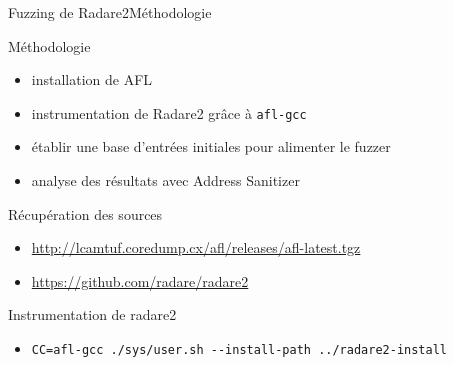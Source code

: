 \begin{frame}[fragile]{Fuzzing de Radare2}{Méthodologie}
  \begin{block}{Méthodologie}
    \begin{itemize}
    \item{installation de AFL}
    \item{instrumentation de Radare2 grâce à \lstinline{afl-gcc}}
    \item{établir une base d'entrées initiales pour alimenter le fuzzer}
    \item{analyse des résultats avec Address Sanitizer}
    \end{itemize}
  \end{block}

  \pause

  \begin{exampleblock}{Récupération des sources}
    \begin{itemize}
    \item{\url{http://lcamtuf.coredump.cx/afl/releases/afl-latest.tgz}}
    \item{\url{https://github.com/radare/radare2}}
    \end{itemize}
  \end{exampleblock}

  \pause
  \vfill

  \begin{exampleblock}{Instrumentation de radare2}
    \begin{itemize}
    \item \lstinline{CC=afl-gcc ./sys/user.sh --install-path ../radare2-install}
    \end{itemize}
  \end{exampleblock}

\end{frame}


